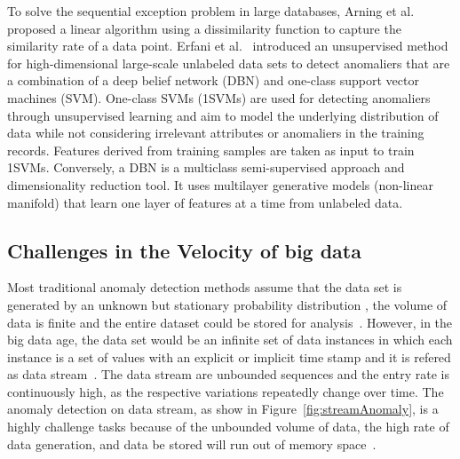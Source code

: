 To solve the sequential exception problem in large databases,
Arning et al.~\cite{arning1996linear} proposed a linear algorithm
using a dissimilarity function to capture the
similarity rate of a data point.
Erfani et al.~\cite{erfani2016high} introduced
an unsupervised method for high-dimensional large-scale
unlabeled data sets to detect anomaliers that
are a combination of a deep belief network (DBN) and one-class
support vector machines (SVM).
One-class SVMs (1SVMs) are used for detecting anomaliers
through unsupervised learning and aim to
model the underlying distribution of data while
not considering irrelevant attributes or
anomaliers in the training records.
Features derived from training samples are taken as input to train 1SVMs.
Conversely,
a DBN is
a multiclass semi-supervised approach and dimensionality reduction tool.
It uses multilayer
generative models (non-linear manifold) that learn one layer of features at a time
from unlabeled data.


\subsection{Challenges in the Velocity of big data}

Most traditional anomaly detection methods assume that
the data set is generated
by an unknown but stationary probability distribution
,
the volume of data is finite and
the entire dataset could be stored for analysis~\cite{silva2013data}.
However,
in the big data age,
the data set would be
an infinite set of data instances in which
each instance is a
set of values with an explicit or
implicit time stamp
and it is refered as data stream~\cite{sadik2014research}.
The data stream are unbounded
sequences and the entry rate is continuously high,
as the respective variations repeatedly
change over time.
The anomaly detection on data stream,
as show in Figure~\ref{fig:streamAnomaly},
is a highly challenge tasks because of
the unbounded volume of data,
the high rate of data generation,
and data be stored will run out of memory space~\cite{sadik2014research}.

